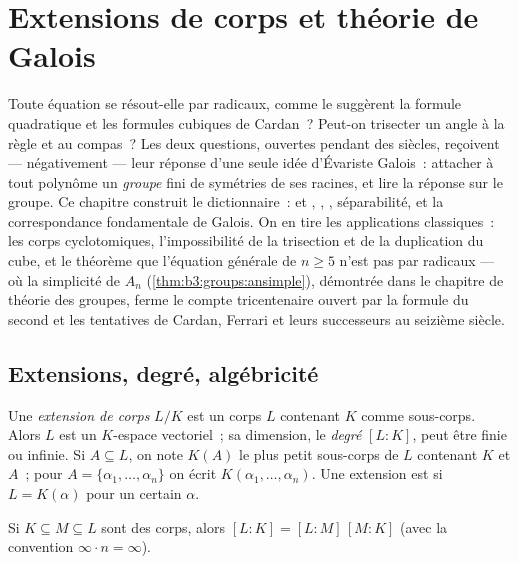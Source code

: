 \chapter{Extensions de corps et théorie de Galois}\label{ch:b3:galois}

Toute équation se résout-elle par radicaux, comme le suggèrent la
formule quadratique et les formules cubiques de Cardan~? Peut-on
trisecter un angle à la règle et au compas~? Les deux questions,
ouvertes pendant des siècles, reçoivent --- négativement --- leur
réponse d'une seule idée d'Évariste Galois~: attacher à tout
polynôme un \emph{groupe} fini de symétries de ses racines, et
lire la réponse sur le groupe. Ce chapitre construit le
dictionnaire~:  et , , , séparabilité, et la correspondance
fondamentale de Galois. On en tire les applications
classiques~: les corps cyclotomiques, l'impossibilité de la
trisection et de la duplication du cube, et le théorème que
l'équation générale de  $n \geq 5$ n'est pas  par
radicaux --- où la simplicité de $A_n$
(\cref{thm:b3:groups:ansimple}), démontrée dans le chapitre de
théorie des groupes, ferme le compte tricentenaire ouvert par
la formule du second  et les tentatives de Cardan, Ferrari et leurs successeurs au seizième siècle.

\section{Extensions, degré, algébricité}

\begin{definition}\label{def:b3:galois:extension}
Une \emph{extension de corps} $L/K$ est
un corps $L$ contenant $K$ comme sous-corps. Alors $L$ est un
$K$-espace vectoriel~; sa dimension, le \emph{degré} $[L:K]$, peut être finie ou infinie. Si $A
\subseteq L$, on note $K(A)$ le plus petit sous-corps de $L$
contenant $K$ et $A$~; pour $A = \{\alpha_1, \dots, \alpha_n\}$ on
écrit $K(\alpha_1, \dots, \alpha_n)$. Une extension est
\emph{} si $L = K(\alpha)$ pour un certain $\alpha$.
\end{definition}

\begin{theorem}\label{thm:b3:galois:tower}
Si $K \subseteq M \subseteq L$ sont des corps, alors $[L:K] =
[L:M]\,[M:K]$ (avec la convention $\infty \cdot n = \infty$).
\end{theorem}

